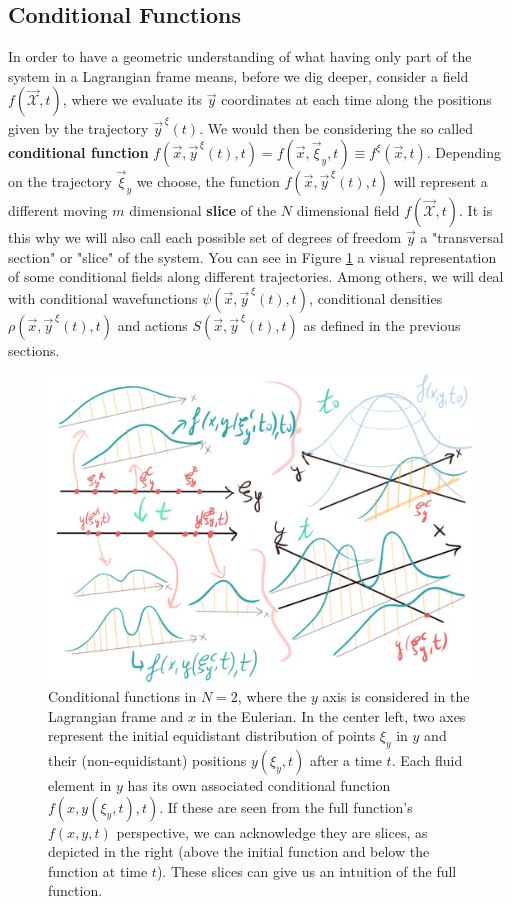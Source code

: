 \documentclass[11pt, a4paper]{article} %
\newcommand{\x}{\mathcal{X}}
\begin{document}
\subsection*{Conditional Functions\vspace{-0.3cm}}

In order to have a geometric understanding of what having only part of the system in a Lagrangian frame means, before we dig deeper, consider a field $f(\vec{\x},t)$, where we evaluate its $\vec{y}$ coordinates at each time along the positions given by the trajectory $\vec{y}^{\, \xi}(t)$. We would then be considering the so called {\bf conditional function} $f(\vec{x}, \vec{y}^{\, \xi}(t),t)=f(\vec{x}, \vec{\xi}_y,t)\equiv f^\xi(\vec{x},t)$. Depending on the trajectory $\vec{\xi}_y$ we choose, the function $f(\vec{x}, \vec{y}^{\, \xi}(t),t)$ will represent a different moving   $m$ dimensional {\bf slice} of the $N$ dimensional field $f(\vec{\x},t)$. It is this why we will also call each possible set of degrees of freedom $\vec{y}$ a "transversal section" or "slice" of the system. You can see in Figure \ref{fig:slices} a visual representation of some conditional fields along different trajectories. Among others, we will deal with conditional wavefunctions $\psi(\vec{x}, \vec{y}^{\, \xi}(t),t)$, conditional densities $\rho(\vec{x}, \vec{y}^{\, \xi}(t),t)$ and actions $S(\vec{x}, \vec{y}^{\, \xi}(t),t)$ as defined in the previous sections.\vspace{-0.3cm}


\begin{figure}[h!]
  \centering
    \includegraphics[width=0.70\linewidth]{6slices_1d.png}
  \caption{Conditional functions in $N=2$, where the $y$ axis is considered in the Lagrangian frame and $x$ in the Eulerian. In the center left, two axes represent the initial equidistant distribution of points $\xi_y$ in $y$ and their (non-equidistant) positions $y(\xi_y,t)$ after a time $t$. Each fluid element in $y$ has its own associated conditional function $f(x,y(\xi_y,t),t)$. If these are seen from the full function's $f(x,y,t)$ perspective, we can acknowledge they are slices, as depicted in the right (above the initial function and below the function at time $t$). These slices can give us an intuition of the full function.  }
  \label{fig:slices}
\end{figure}
\end{document}

